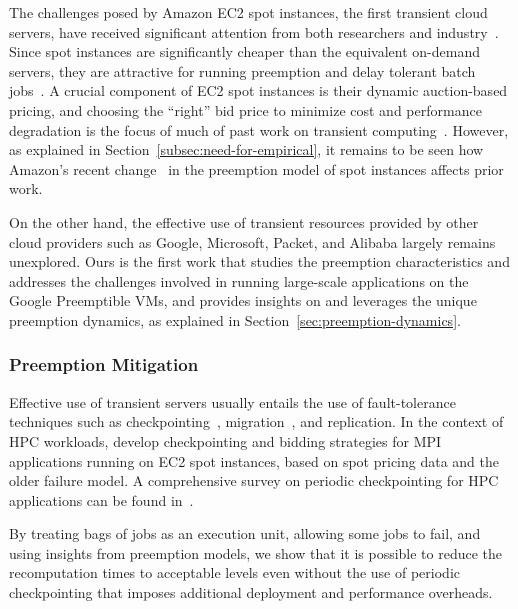 The challenges posed by Amazon EC2 spot instances, the first transient cloud servers, have received significant attention from both researchers and industry~\cite{spotinst}.
Since spot instances are significantly cheaper than the equivalent on-demand servers, they are attractive for running preemption and delay tolerant batch jobs~\cite{spoton, jain14demand, yi2010reducing, conductor, liu-spot, spot-run, dubois2016optispot}.
A crucial component of EC2 spot instances is their dynamic auction-based pricing, and choosing the ``right'' bid price to minimize cost and performance degradation is the focus of much of past work on transient computing~\cite{bidding4,mihailescu2012impact,bidding7,bidding1,bidding8,bidding3,bidding6,bid-cloud,bidding5,wolski_probabilistic_2017, guo_bidding_2015}.
However, as explained in Section~\ref{subsec:need-for-empirical}, it remains to be seen how Amazon's recent change~\cite{} in the preemption model of spot instances affects prior work.


On the other hand, the effective use of transient resources provided by other cloud providers such as Google, Microsoft, Packet, and Alibaba largely remains unexplored. 
Ours is the first work that studies the preemption characteristics and addresses the challenges involved in running large-scale applications on the Google Preemptible VMs, and provides insights on and leverages the unique preemption dynamics, as explained in Section~\ref{sec:preemption-dynamics}.

\vspace*{\subsecspace}
\subsubsection{Preemption Mitigation}
Effective use of transient servers usually entails the use of fault-tolerance techniques such as checkpointing~\cite{flint}, migration~\cite{spotcheck}, and replication.
In the context of HPC workloads,\cite{marathe2014exploiting,gong_monetary_2015,xiang_spotmpi:_2011} develop checkpointing and bidding strategies for MPI applications running on EC2 spot instances, based on spot pricing data and the older failure model.
A comprehensive survey on periodic checkpointing for HPC applications can be found in~\cite{dongarra_fault_nodate}. 

By treating bags of jobs as an execution unit, allowing some jobs to fail, and using insights from preemption models, we show that it is possible to reduce the recomputation times to acceptable levels even without the  use of periodic  checkpointing that imposes additional deployment and performance overheads.

